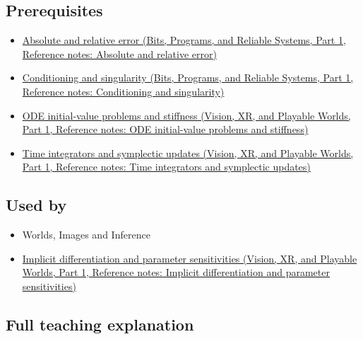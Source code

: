 \subsection{Prerequisites}\label{appendix-18eacf61a04b-prerequisites}

\hypertarget{appendix-18eacf61a04b-prerequisites}{}

\begin{itemize}
\tightlist
\item
  \href{../01-Bits-Programs-and-Reliable-Systems-P01/main.pdf\#nameddest=appendix-3ae74e89b4e6}{Absolute and relative error (Bits, Programs, and Reliable Systems, Part 1, Reference notes: Absolute and relative error)}
\item
  \href{../01-Bits-Programs-and-Reliable-Systems-P01/main.pdf\#nameddest=appendix-8f6a01f284a7}{Conditioning and singularity (Bits, Programs, and Reliable Systems, Part 1, Reference notes: Conditioning and singularity)}
\item
  \href{../07-Vision-XR-and-Playable-Worlds-P01/main.pdf\#nameddest=appendix-e8ab9836882e}{ODE initial-value problems and stiffness (Vision, XR, and Playable Worlds, Part 1, Reference notes: ODE initial-value problems and stiffness)}
\item
  \href{../07-Vision-XR-and-Playable-Worlds-P01/main.pdf\#nameddest=appendix-8f96f9c4d5bc}{Time integrators and symplectic updates (Vision, XR, and Playable Worlds, Part 1, Reference notes: Time integrators and symplectic updates)}
\end{itemize}

\subsection{Used by}\label{appendix-18eacf61a04b-used-by}

\hypertarget{appendix-18eacf61a04b-used-by}{}

\begin{itemize}
\tightlist
\item
  {Worlds, Images and Inference}
\item
  \href{../07-Vision-XR-and-Playable-Worlds-P01/main.pdf\#nameddest=appendix-8836553d56fc}{Implicit differentiation and parameter sensitivities (Vision, XR, and Playable Worlds, Part 1, Reference notes: Implicit differentiation and parameter sensitivities)}
\end{itemize}

\subsection{Full teaching explanation}\label{appendix-18eacf61a04b-full-teaching-explanation}

